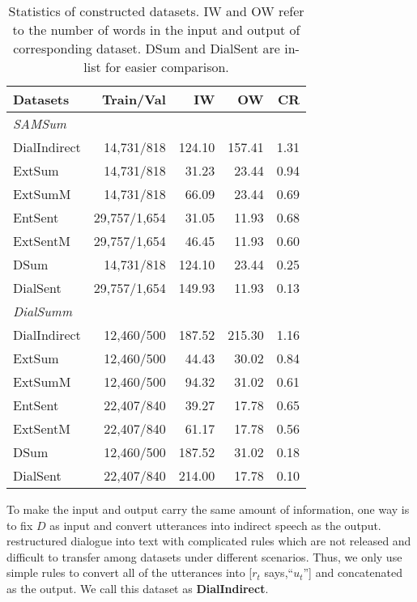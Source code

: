 \begin{table}[h]
	\small
	\centering
	\begin{tabular}{lrrrr}
		\toprule[1pt]
		\textbf{Datasets} & \textbf{Train/Val} & \textbf{IW} & \textbf{OW} & \textbf{CR} \\
		\midrule[1pt]
		\multicolumn{5}{l}{\textit{SAMSum}} \\
		{DialIndirect} & 14,731/818 & 124.10 & 157.41 & 1.31 \\
		{ExtSum} & 14,731/818 & 31.23 & 23.44 &0.94  \\
		{ExtSumM} & 14,731/818 & 66.09 &23.44 & 0.69 \\
		{EntSent} & 29,757/1,654 & 31.05 & 11.93 &0.68  \\
		{ExtSentM} & 29,757/1,654 & 46.45 & 11.93 & 0.60 \\
		{DSum} & 14,731/818 & 124.10 & 23.44 & 0.25 \\
		{DialSent} &29,757/1,654  & 149.93 & 11.93 & 0.13 \\
		\midrule[1pt]
		\multicolumn{5}{l}{\textit{DialSumm}} \\
		{DialIndirect} & 12,460/500 & 187.52 & 215.30 & 1.16 \\
		{ExtSum} & 12,460/500 & 44.43 & 30.02 &0.84 \\
		{ExtSumM} & 12,460/500 & 94.32 &31.02 &0.61  \\
		{EntSent} & 22,407/840 & 39.27 &17.78  &0.65  \\
		{ExtSentM} &22,407/840  &61.17  & 17.78 & 0.56 \\
		{DSum} & 12,460/500 & 187.52 & 31.02 & 0.18 \\
		{DialSent} &22,407/840  &214.00 & 17.78 & 0.10 \\
		\bottomrule[1pt]
	\end{tabular}
	\caption{Statistics of constructed datasets. IW and OW refer to the number of words in the input and output of corresponding dataset. DSum and DialSent are in-list for easier comparison.}
	\label{tab:rephrasedatasets}
\end{table}


To make the input and output carry the same amount of information,
one way is to fix $D$ as input and convert utterances into indirect speech
as the output. \citet{ganesh2019restructuring} restructured dialogue into text with complicated rules
which are not released and difficult to transfer among datasets under different scenarios. Thus, we only use simple rules to convert all of the utterances into [$r_t$ says,``$u_t$''] and concatenated as the output. We call this dataset as \textbf{DialIndirect}.

